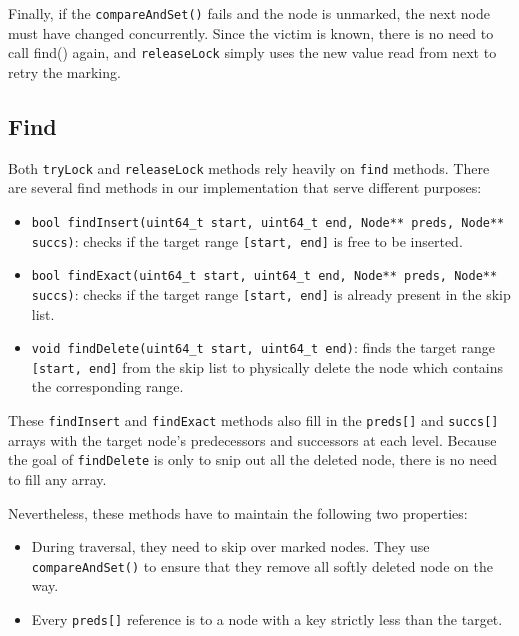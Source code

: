 Finally, if the \texttt{compareAndSet()} fails and the node is unmarked, the next node must have changed concurrently. 
Since the victim is known, there is no need to call find() again, and \texttt{releaseLock} simply uses the new value read from next to retry the marking.

\subsection{Find}\label{subsec:find}

Both \texttt{tryLock} and \texttt{releaseLock} methods rely heavily on \texttt{find} methods.
There are several find methods in our implementation that serve different purposes:

\begin{itemize}
    \item \texttt{bool findInsert(uint64\_t start, uint64\_t end, Node** preds, Node** succs)}: checks if the target range \texttt{[start, end]} is free to be inserted.
    
    \item \texttt{bool findExact(uint64\_t start, uint64\_t end, Node** preds, Node** succs)}: checks if the target range \texttt{[start, end]} is already present in the skip list.
    
    \item \texttt{void findDelete(uint64\_t start, uint64\_t end)}: finds the target range \texttt{[start, end]} from the skip list to physically delete the node which contains the corresponding range.
\end{itemize}

These \texttt{findInsert} and \texttt{findExact} methods also fill in the \texttt{preds[]} and \texttt{succs[]} arrays with the target node's predecessors and successors at each level.
Because the goal of \texttt{findDelete} is only to snip out all the deleted node, there is no need to fill any array.

Nevertheless, these methods have to maintain the following two properties:

\begin{itemize}
    \item During traversal, they need to skip over marked nodes.
    They use \texttt{compareAndSet()} to ensure that they remove all softly deleted node on the way.
    \item Every \texttt{preds[]} reference is to a node with a key strictly less than the target.
\end{itemize}

